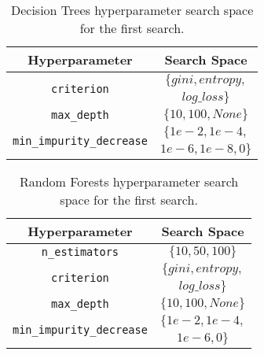 
\begin{table}[H]
    \centering
    \begin{tabular}{|c|c|}
        \hline
        
        \textbf{Hyperparameter} & 
        \textbf{Search Space} \\
        
        \hline
        
        \multirow{2}{*}{\texttt{criterion}} & 
        $\{gini, entropy,$ \\ 
        & $ log\_loss\}$ \\

        \hline
        
        \texttt{max\_depth} & 
        $\{10, 100, None\}$ \\

        \hline
        
        \multirow{2}{*}{\texttt{min\_impurity\_decrease}} & 
        $\{1e-2, 1e-4,$ \\ 
        & $ 1e-6, 1e-8, 0\}$\\

        \hline
    \end{tabular}
    \caption{Decision Trees hyperparameter 
    search space for the first search.}
    \label{tab:dt_search_spaces_1}
\end{table}

\begin{table}[H]
    \centering
    \begin{tabular}{|c|c|}
        \hline
        
        \textbf{Hyperparameter} & 
        \textbf{Search Space} \\
        
        \hline
        
        \texttt{n\_estimators} & 
        $\{10, 50, 100\}$ \\

        \hline
        
        \multirow{2}{*}{\texttt{criterion}} & 
        $\{gini, entropy,$ \\ 
        & $ log\_loss\}$ \\

        \hline
        
        \texttt{max\_depth} & 
        $\{10, 100, None\}$ \\

        \hline
        
        \multirow{2}{*}{\texttt{min\_impurity\_decrease}} & 
        $\{1e-2, 1e-4,$ \\ 
        & $ 1e-6, 0\}$\\

        \hline
    \end{tabular}
    \caption{Random Forests hyperparameter 
    search space for the first search.}
    \label{tab:rf_search_spaces_1}
\end{table}

